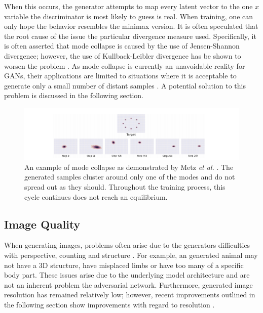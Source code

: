 \documentclass[11pt]{article}
\begin{document}
When this occurs, the generator attempts to map every latent vector to the one $x$ variable the discriminator is most likely to guess is real. When training, one can only hope the behavior resembles the minimax version. It is often speculated that the root cause of the issue the particular divergence measure used. Specifically, it is often asserted that mode collapse is caused by the use of Jensen-Shannon divergence; however, the use of Kullback-Leibler divergence has be shown to worsen the problem \citep{2017arXiv170100160G}. As mode collapse is currently an unavoidable reality for GANs, their applications are limited to situations where it is acceptable to generate only a small number of distant samples \citep{2017arXiv170100160G}. A potential solution to this problem is discussed in the following section.

\begin{figure}
\centering
\includegraphics[scale=0.8]{modecollapse}
\caption{An example of mode collapse as demonstrated by Metz \textit{et al.} \citep{2016arXiv161102163M}. The generated samples cluster around only one of the modes and do not spread out as they should. Throughout the training process, this cycle continues does not reach an equilibrium.}
\label{fig:Mode Collapse Example}
\end{figure}

\subsection{Image Quality}
When generating images, problems often arise due to the generators difficulties with perspective, counting and structure \citep{2017arXiv170100160G}. For example, an generated animal may not have a 3D structure, have misplaced limbs or have too many of a specific body part. These issues arise due to the underlying model architecture and are not an inherent problem the adversarial network. Furthermore, generated image resolution has remained relatively low; however, recent improvements outlined in the following section show improvements with regard to resolution \citep{2017arXiv171010196K}.
\end{document}
